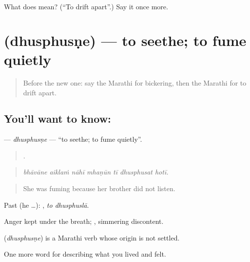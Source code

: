 \begin{tcolorbox}[breakable,colback=teal!4,colframe=teal!35!black,title={Before you move on}]
What does  mean? (\textquotedblleft{}To drift apart\textquotedblright{}.) Say it once more.
\end{tcolorbox}
\section[\texorpdfstring{\mr{धुसफुसणे} (dhusphusṇe)}{धुसफुसणे (dhusphusṇe)}]{ (dhusphusṇe) — to seethe; to fume quietly}

\label{lesson:MR-C502-dhusphusne}



\begin{quote}
Before the new one: say the Marathi for bickering, then the Marathi for to drift apart.
\end{quote}

\subsection*{You'll want to know: }
\textbf{} — \emph{dhusphusṇe} — \textquotedblleft{}to seethe; to fume quietly\textquotedblright{}.

\begin{quote}
      .
\end{quote}

\begin{quote}
\emph{bhāvāne aiklaṁ nāhī mhaṇūn tī dhusphusat hotī.}
\end{quote}

\begin{quote}
She was fuming because her brother did not listen.
\end{quote}

Past (he …):  , \emph{to dhusphuslā}.

Anger kept under the breath; , simmering discontent.

\begin{cousinweb}
\textbf{} (\emph{dhusphusṇe}) is a Marathi verb whose origin is not settled.
\end{cousinweb}

\begin{grammarlens}[title={What you've built}]
One more word for describing what you lived and felt.
\end{grammarlens}

